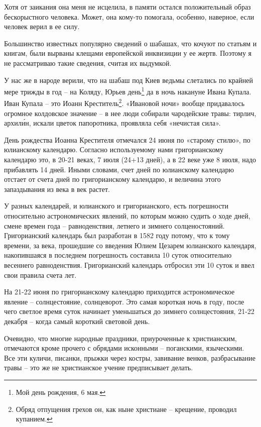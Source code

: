 Хотя от заикания она меня не исцелила, в памяти остался положительный образ бескорыстного человека. Может, она кому-то помогала, особенно, наверное, если человек верил в ее силу.
 
Большинство известных популярно сведений о шабашах, что кочуют по статьям и книгам, были вырваны клещами европейской инквизиции у ее жертв. Поэтому я не рассматриваю такие сведения, считая их выдумкой.

У нас же в народе верили, что на шабаш под Киев ведьмы слетались по крайней мере трижды в год – на Коляду, Юрьев день\footnote{Мой день рождения, 6 мая.} да в ночь накануне Ивана Купала. Иван Купала – это Иоанн Креститель\footnote{Обряд отпущения грехов он, как ныне христиане – крещение, проводил купанием.}. «Ивановой ночи» вообще придавалось огромное колдовское значение – в нее люди собирали чародейские травы: тирлич, архил\'ин, искали цветок папоротника, проявляла себя «нечистая сила».

День рождества Иоанна Крестителя отмечался 24 июня по «старому стилю», по юлианскому календарю. Согласно используемому нами григорианскому календарю это, в 20-21 веках, 7 июля (24+13 дней), а в 22 веке уже 8 июля, надо прибавлять 14 дней. Иными словами, счет дней по юлианскому календарю отстает от счета дней по григорианскому календарю, и величина этого запаздывания из века в век растет.

У разных календарей, и юлианского и григорианского, есть погрешности относительно астрономических явлений, по которым можно судить о ходе дней, смене времен года – равноденствия, летнего и зимнего солценостояний. Григорианский календарь был разработан в 1582 году потому, что к тому времени, за века, прошедшие со введения Юлием Цезарем юлианского календаря, накопившаяся в последнем погрешность составила 10 суток относительно весеннего равноденствия. Григорианский календарь отбросил эти 10 суток и ввел свои правила счета лет.

На 21-22 июня по григорианскому календарю приходится астрономическое явление – солнцестояние, солнцеворот. Это самая короткая ночь в году, после чего светлое время суток начинает уменьшаться до зимнего солнцестояния, 21-22 декабря – когда самый короткий световой день.

Очевидно, что многие народные праздники, приуроченные к христианским, отмечаются кроме прочего с обрядами исконными – поганскими, языческими. Все эти куличи, писанки, прыжки через костры, завивание венков, разбрасывание травы – это же не христианское учение предписывает делать.

